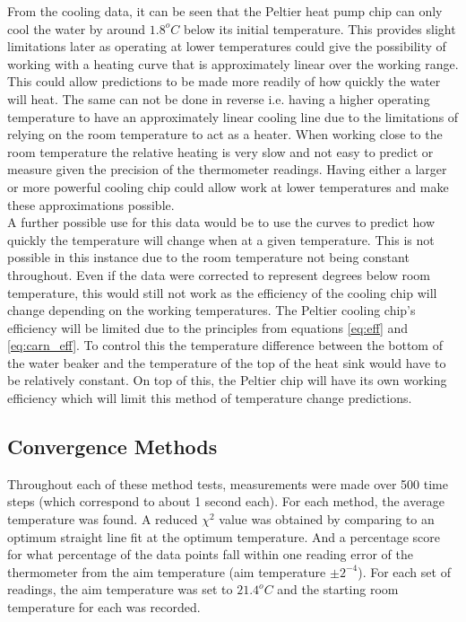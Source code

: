 \documentclass[10pt]{article}
\begin{document}
From the cooling data, it can be seen that the Peltier heat pump chip can only cool the water by around $1.8^oC$ below its initial temperature. This provides slight limitations later as operating at lower temperatures could give the possibility of working with a heating curve that is approximately linear over the working range. This could allow predictions to be made more readily of how quickly the water will heat. The same can not be done in reverse i.e. having a higher operating temperature to have an approximately linear cooling line due to the limitations of relying on the room temperature to act as a heater. When working close to the room temperature the relative heating is very slow and not easy to predict or measure given the precision of the thermometer readings. Having either a larger or more powerful cooling chip could allow work at lower temperatures and make these approximations possible. \\

A further possible use for this data would be to use the curves to predict how quickly the temperature will change when at a given temperature. This is not possible in this instance due to the room temperature not being constant throughout. Even if the data were corrected to represent degrees below room temperature, this would still not work as the efficiency of the cooling chip will change depending on the working temperatures. The Peltier cooling chip's efficiency will be limited due to the principles from equations \ref{eq:eff} and \ref{eq:carn_eff}. To control this the temperature difference between the bottom of the water beaker and the temperature of the top of the heat sink would have to be relatively constant. On top of this, the Peltier chip will have its own working efficiency which will limit this method of temperature change predictions.

\subsection*{Convergence Methods}
Throughout each of these method tests, measurements were made over 500 time steps (which correspond to about 1 second each). For each method, the average temperature was found. A reduced $\chi^2$ value was obtained by comparing to an optimum straight line fit at the optimum temperature. And a percentage score for what percentage of the data points fall within one reading error of the thermometer from the aim temperature (aim temperature $\pm 2^{-4}$). For each set of readings, the aim temperature was set to $21.4^oC$ and the starting room temperature for each was recorded.\\
\end{document}
